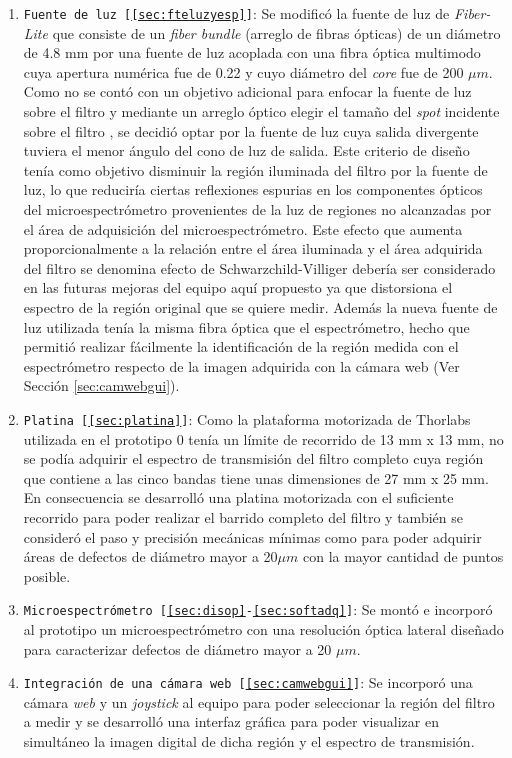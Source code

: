 \begin{enumerate}
\justifying
\item \texttt{Fuente de luz [\ref{sec:fteluzyesp}]}: Se modificó la fuente de luz de \textit{Fiber-Lite} que consiste de un \textit{fiber bundle} (arreglo de fibras ópticas) de un diámetro de 4.8 mm por una fuente de luz acoplada con una fibra óptica multimodo cuya apertura numérica fue de 0.22 y cuyo diámetro del \textit{core} fue de 200 $\mu m$. Como no se contó con un objetivo adicional para enfocar la fuente de luz sobre el filtro y mediante un arreglo óptico elegir el tamaño del \textit{spot} incidente sobre el filtro , se decidió optar por la fuente de luz cuya salida divergente tuviera el menor ángulo del cono de luz de salida. Este criterio de diseño tenía como objetivo disminuir la región iluminada del filtro por la fuente de luz, lo que reduciría ciertas reflexiones espurias en los componentes ópticos del microespectrómetro provenientes de la luz de regiones no alcanzadas por el área de adquisición del microespectrómetro. Este efecto que aumenta proporcionalmente a la relación entre el área iluminada y el área adquirida del filtro se denomina efecto de Schwarzchild-Villiger \cite{Naora279} debería ser considerado en las futuras mejoras del equipo aquí propuesto ya que distorsiona el espectro de la región original que se quiere medir. Además la nueva fuente de luz utilizada tenía la misma fibra óptica que el espectrómetro, hecho que permitió realizar fácilmente la identificación de la región medida con el espectrómetro respecto de la imagen adquirida con la cámara web (Ver Sección \ref{sec:camwebgui}).
\item \texttt{Platina [\ref{sec:platina}]}: Como la plataforma motorizada de Thorlabs utilizada en el prototipo 0 tenía un límite de recorrido de 13 mm x 13 mm, no se podía adquirir el espectro de transmisión del filtro completo cuya región que contiene a las cinco bandas tiene unas dimensiones de 27 mm x 25 mm. En consecuencia se desarrolló una platina motorizada con el suficiente recorrido para poder realizar el barrido completo del filtro y también se consideró el paso y precisión mecánicas mínimas como para poder adquirir áreas de defectos de diámetro mayor a 20$\mu m$ con la mayor cantidad de puntos posible.
\item \texttt{Microespectrómetro [\ref{sec:disop}-\ref{sec:softadq}]}: Se montó e incorporó al prototipo un microespectrómetro con una resolución óptica lateral diseñado para caracterizar defectos de diámetro mayor a 20 $\mu m$.
\item \texttt{Integración de una cámara web [\ref{sec:camwebgui}]}: Se incorporó una cámara \textit{web} y un  \textit{joystick} al equipo para poder seleccionar la región del filtro a medir y se desarrolló una interfaz gráfica para poder visualizar en simultáneo la imagen digital de dicha región y el espectro de transmisión. 
\end{enumerate}

